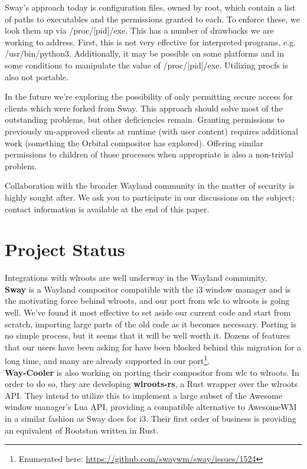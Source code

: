 \documentclass{article}
\begin{document}
Sway's approach today is configuration files, owned by root, which contain a
list of paths to executables and the permissions granted to each. To enforce
these, we look them up via /proc/[pid]/exe. This has a number of drawbacks we
are working to address. First, this is not very effective for interpreted
programs, e.g. /usr/bin/python3. Additionally, it may be possible on some
platforms and in some conditions to manipulate the value of /proc/[pid]/exe.
Utilizing procfs is also not portable.

In the future we're exploring the possibility of only permitting secure access
for clients which were forked from Sway. This approach should solve most of the
outstanding problems, but other deficiencies remain. Granting permissions to
previously un-approved clients at runtime (with user content) requires
additional work (something the Orbital compositor has explored). Offering
similar permissions to children of those processes when appropriate is also a
non-trivial problem.

Collaboration with the broader Wayland community in the matter of security is
highly sought after. We ask you to participate in our discussions on the
subject; contact information is available at the end of this paper.

\section{Project Status}

Integrations with wlroots are well underway in the Wayland community.\\

\textbf{Sway} is a Wayland compositor compatible with the i3 window manager and
is the motivating force behind wlroots, and our port from wlc to wlroots is
going well. We've found it most effective to set aside our current code and
start from scratch, importing large parts of the old code as it becomes
necessary. Porting is no simple process, but it seems that it will be well worth
it. Dozens of features that our users have been asking for have been blocked
behind this migration for a long time, and many are already supported in our
port\footnote{Enumerated here:
\url{https://github.com/swaywm/sway/issues/1524}}.\\

\textbf{Way-Cooler} is also working on porting their compositor from wlc to
wlroots. In order to do so, they are developing \textbf{wlroots-rs}, a Rust
wrapper over the wlroots API. They intend to utilize this to implement a large
subset of the Awesome window manager's Lua API, providing a compatible
alternative to AwesomeWM in a similar fashion as Sway does for i3. Their first
order of business is providing an equivalent of Rootston written in Rust.\\
\end{document}
